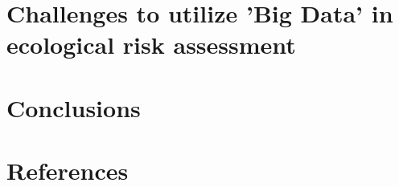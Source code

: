 \section{Challenges to utilize 'Big Data' in ecological risk assessment}




\section{Conclusions}






\section{References}
\printbibliography[heading=none]
